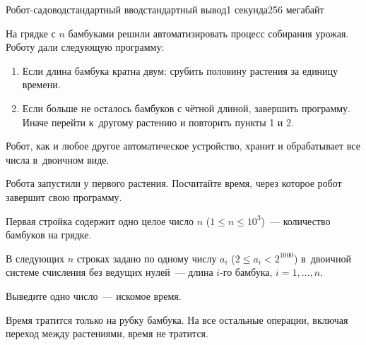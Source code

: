 \begin{problem}[(Парников В.\,В.)]{Робот-садовод\label{robotgardener}}{стандартный ввод}{стандартный вывод}{1 секунда}{256 мегабайт}

На грядке с $n$ бамбуками решили автоматизировать процесс собирания урожая. Роботу дали следующую программу:
\begin{enumerate}
  \item Если длина бамбука кратна двум: срубить половину растения за единицу времени.
  \item Если больше не осталось бамбуков с чётной длиной, завершить программу. Иначе перейти к~другому растению и повторить пункты 1 и 2.
\end{enumerate}

Робот, как и любое другое автоматическое устройство, хранит и обрабатывает все числа в~двоичном виде.

Робота запустили у первого растения. Посчитайте время, через которое робот завершит свою программу.



\InputFile
Первая стройка содержит одно целое число $n$ ($1 \leq n \leq 10^3$)~--- количество бамбуков на грядке.

В следующих $n$ строках задано по одному числу $a_i$ ($2 \leq a_i < 2^{1000}$) в~двоичной системе счисления без ведущих нулей~--- длина $i$-го бамбука, $i = 1, \dots, n$.

\OutputFile
Выведите одно число~--- искомое время.

\Example

\begin{example}
%
\end{example}

\Note
Время тратится только на рубку бамбука. На все остальные операции, включая переход между растениями, время не тратится.

\end{problem}

